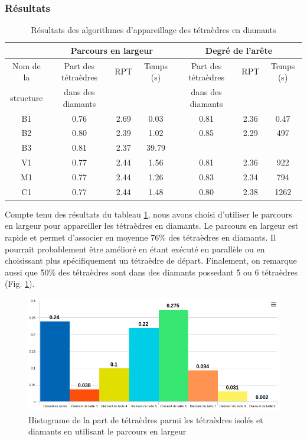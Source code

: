 \documentclass[a4paper,11pt,openany]{article}
\begin{document}
\subsubsection{Résultats}
\noindent
\begin{table}[H]
\centering
\footnotesize
\begin{tabular}{|c | c | c | c| c | c | c |}
\hline
& \multicolumn{3}{|c|}{Parcours en largeur}& \multicolumn{3}{|c|}{Degré de l'arête}\\
\hline
Nom de la & Part des tétraèdres & RPT & Temps (s) & Part des tétraèdres & RPT & Temps (s)\\
structure&dans des diamants&&&dans des diamants&&\\
\hline
B1 & 0.76 & 2.69 & 0.03 & 0.81 & 2.36 & 0.47 \\
B2 &  0.80 & 2.39 & 1.02 & 0.85 & 2.29 & 497 \\
B3 & 0.81 & 2.37 & 39.79 &  &  &\\
V1 & 0.77 & 2.44 & 1.56 & 0.81 & 2.36 & 922\\
M1 & 0.77 & 2.44 & 1.26 & 0.83 & 2.34 & 794\\
C1 & 0.77 & 2.44 & 1.48 & 0.80 & 2.38 & 1262\\
\hline  
\end{tabular}
\label{tab:results_performances}
\caption{Résultats des algorithmes d'appareillage des tétraèdres en diamants}
\end{table}
\noindent
Compte tenu des résultats du tableau \ref{tab:results_performances}, nous avons choisi d'utiliser le parcours en largeur pour appareiller les tétraèdres en diamants. Le parcours en largeur est rapide et permet d'associer en moyenne 76\% des tétraèdres en diamants. Il pourrait probablement être amélioré en étant exécuté en parallèle ou en choisissant plus spécifiquement un tétraèdre de départ. Finalement, on remarque aussi que 50\% des tétraèdres sont dans des diamants possedant 5 ou 6 tétraèdres (Fig. \ref{fig:bfs_starting}).
\begin{figure}[H]
\begin{center}
\includegraphics[scale=0.45]{Images/histograme}
\caption{Histograme de la part de tétraèdres parmi les tétraèdres isolés et diamants en utilisant le parcours en largeur}
\label{fig:bfs_starting}
\end{center}
\end{figure}
\end{document}
